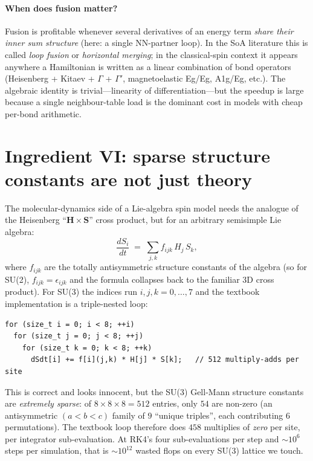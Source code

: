 \documentclass[11pt,letterpaper]{article}
\begin{document}
\paragraph{When does fusion matter?}  Fusion is profitable whenever
several derivatives of an energy term \emph{share their inner sum
structure} (here: a single NN-partner loop).  In the SoA literature
this is called \emph{loop fusion} or \emph{horizontal merging}; in the
classical-spin context it appears anywhere a Hamiltonian is written
as a linear combination of bond operators (Heisenberg + Kitaev
+ $\Gamma$ + $\Gamma'$, magnetoelastic Eg/Eg, A1g/Eg, etc.).  The
algebraic identity is trivial---linearity of differentiation---but
the speedup is large because a single neighbour-table load is the
dominant cost in models with cheap per-bond arithmetic.

\section{Ingredient VI: sparse structure constants are not just
                       theory}
\label{sec:sparse-su3}

The molecular-dynamics side of a Lie-algebra spin model needs the
analogue of the Heisenberg ``$\mathbf{H} \times \mathbf{S}$'' cross
product, but for an arbitrary semisimple Lie algebra:
\[
   \frac{d S_i}{dt} \;=\; \sum_{j,k} f_{ijk}\, H_j\, S_k ,
\]
where $f_{ijk}$ are the totally antisymmetric structure constants of
the algebra (so for SU(2), $f_{ijk} = \epsilon_{ijk}$ and the formula
collapses back to the familiar 3D cross product).  For SU(3) the
indices run $i,j,k = 0,\ldots,7$ and the textbook implementation is a
triple-nested loop:
\begin{lstlisting}
for (size_t i = 0; i < 8; ++i)
  for (size_t j = 0; j < 8; ++j)
    for (size_t k = 0; k < 8; ++k)
      dSdt[i] += f[i](j,k) * H[j] * S[k];   // 512 multiply-adds per site
\end{lstlisting}
This is correct and looks innocent, but the SU(3) Gell-Mann structure
constants are \emph{extremely sparse}: of $8 \times 8 \times 8 = 512$
entries, only $54$ are non-zero (an antisymmetric $(a{<}b{<}c)$ family
of $9$ ``unique triples'', each contributing $6$ permutations).  The
textbook loop therefore does $458$ multiplies of \emph{zero} per site,
per integrator sub-evaluation.  At RK4's four sub-evaluations per step
and $\sim 10^{6}$ steps per simulation, that is $\sim 10^{12}$ wasted
flops on every SU(3) lattice we touch.
\end{document}
